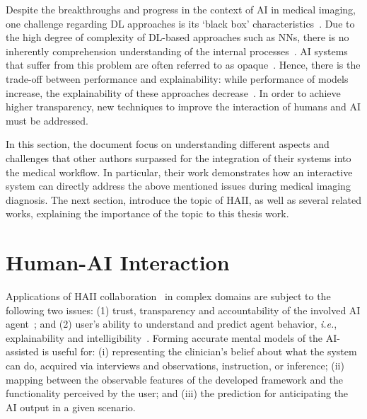 Despite the breakthroughs and progress in the context of \ac{AI} in medical imaging, one challenge regarding \ac{DL} approaches is its `black box' characteristics~\cite{10.1007/978-3-030-50334-5_4, 10.1145/3306618.3314293}.
Due to the high degree of complexity of \ac{DL}-based approaches such as \acp{NN}, there is no inherently comprehension understanding of the internal processes~\cite{8851763}.
\ac{AI} systems that suffer from this problem are often referred to as opaque~\cite{zednik2019solving}.
Hence, there is the trade-off between performance and explainability: while performance of models increase, the explainability of these approaches decrease~\cite{gunning2017explainable}.
In order to achieve higher transparency, new techniques to improve the interaction of humans and \ac{AI} must be addressed.

In this section, the document focus on understanding different aspects and challenges that other authors surpassed for the integration of their systems into the medical workflow.
In particular, their work demonstrates how an interactive system can directly address the above mentioned issues during medical imaging diagnosis.
The next section, introduce the topic of \ac{HAII}, as well as several related works, explaining the importance of the topic to this thesis work.

\section{Human-AI Interaction}
\label{sec:sec003002}

Applications of \ac{HAII} collaboration~\cite{dellermann2019future} in complex domains are subject to the following two issues:
(1) trust, transparency and accountability of the involved \ac{AI} agent~\cite{10.1145/3290605.3300233}; and
(2) user's ability to understand and predict agent behavior, {\it i.e.}, explainability and intelligibility~\cite{Cai:2019:EEE:3301275.3302289, gunning2017explainable, miller2018explanation}.
Forming accurate mental models of the \ac{AI}-assisted is useful for:
(i) representing the clinician's belief about what the system can do, acquired via interviews and observations, instruction, or inference;
(ii) mapping between the observable features of the developed framework and the functionality perceived by the user; and
(iii) the prediction for anticipating the \ac{AI} output in a given scenario.

